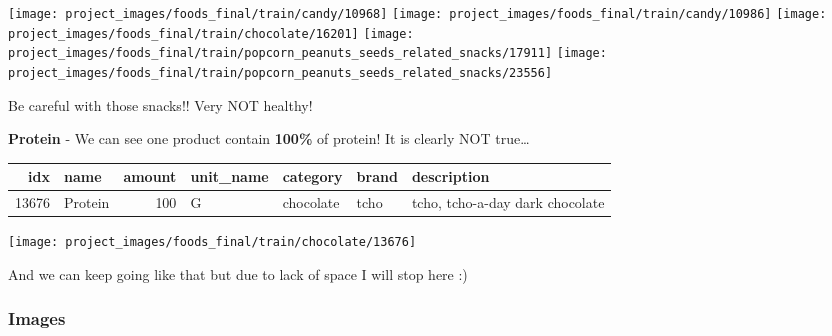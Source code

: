 \documentclass[
]{article}
\newenvironment{Shaded}{\begin{snugshade}}{\end{snugshade}}
\newcommand{\DecValTok}[1]{\textcolor[rgb]{0.00,0.00,0.81}{#1}}
\newcommand{\KeywordTok}[1]{\textcolor[rgb]{0.13,0.29,0.53}{\textbf{#1}}}
\newcommand{\NormalTok}[1]{#1}
\newcommand{\OperatorTok}[1]{\textcolor[rgb]{0.81,0.36,0.00}{\textbf{#1}}}
\newcommand{\StringTok}[1]{\textcolor[rgb]{0.31,0.60,0.02}{#1}}
\begin{document}
\begin{center}\texttt{[image: project\_images/foods\_final/train/candy/10968]} \texttt{[image: project\_images/foods\_final/train/candy/10986]} \texttt{[image: project\_images/foods\_final/train/chocolate/16201]} \texttt{[image: project\_images/foods\_final/train/popcorn\_peanuts\_seeds\_related\_snacks/17911]} \texttt{[image: project\_images/foods\_final/train/popcorn\_peanuts\_seeds\_related\_snacks/23556]} \end{center}

Be careful with those snacks!! Very NOT healthy!

\textbf{Protein} - We can see one product contain \textbf{100\%} of
protein! It is clearly NOT true\ldots{}

\begin{Shaded}
\end{Shaded}

\begin{table}[H]
\centering\begingroup\fontsize{7}{9}\selectfont

\begin{tabular}{rlrllll}
\toprule
idx & name & amount & unit\_name & category & brand & description\\
\midrule
13676 & Protein & 100 & G & chocolate & tcho & tcho, tcho-a-day dark chocolate\\
\bottomrule
\end{tabular}
\endgroup{}
\end{table}

\begin{center}\texttt{[image: project\_images/foods\_final/train/chocolate/13676]} \end{center}

And we can keep going like that but due to lack of space I will stop
here :)

\hypertarget{images}{%
\subsubsection{Images}\label{images}}
\end{document}
